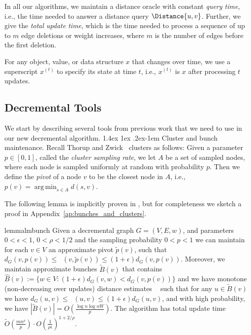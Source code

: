 \documentclass[11pt]{article}
\makeatletter
\theoremstyle{definition}
\theoremstyle{remark}
\DeclareMathOperator*{\argmin}{arg\,min}
\DeclareMathOperator{\dLNbunch}{\delta_{\tilde{B}}}
\renewcommand{\paragraph}{%
  \@startsection{paragraph}{4}%
  {\z@}{1.4ex \@plus 1ex \@minus .2ex}{-1em}%
  {\normalfont\normalsize\bfseries}%
}
\makeatother
\begin{document}
\begin{titlepage}
In all our algorithms, we maintain a distance oracle with constant \emph{query time}, i.e., the time needed to answer a distance query $\Distance{u,v}$.
Further, we give the \emph{total update time}, which is the time needed to process a sequence of up to $m$ edge deletions or weight increases, where $m$ is the number of edges before the first deletion. 

For any object, value, or data structure $x$ that changes over time, we use a superscript $x^{(t)}$ to specify its state at time $t$, i.e., $x^{(t)}$ is $x$ after processing $t$ updates. 



\subsection{Decremental Tools}\label{sc:decr_tools}
We start by describing several tools from previous work that we need to use in our new decremental algorithm.
\paragraph{Cluster and bunch maintenance.} 
Recall Thorup and Zwick~\cite{TZ2005} clusters as follows: Given a parameter $p\in [0,1]$, called the \emph{cluster sampling rate}, we let $A$ be a set of sampled nodes, where each node is sampled uniformly at random with probability $p$. Then we define the \emph{pivot} of a node $v$ to be the closest node in $A$, i.e., $p(v)=\argmin_{s\in A} d(s,v)$. 

The following lemma is implicitly proven in \cite{LN2020}, but for completeness we sketch a proof in Appendix~\ref{ap:bunches_and_clusters}.

\begin{restatable}{lemma}{lmbunch} \label{lm:approx_bunches_on_G}
Given a decremental graph $G=(V,E,w)$, and parameters $0< \epsilon <1$, $0<\rho<1/2$ and the sampling probability $0< p <1$ we can maintain for each $v\in V$ an approximate pivot $\tilde p(v)$, such that $d_G(v,p(v)) \leq \dLNbunch(v,\tilde{p}(v)) \leq (1+\epsilon) d_G(v,p(v))$.
Moreover, we maintain approximate bunches $\tilde{B}(v)$ that contains
$\hat{B}(v):= \{ w \in V : (1+\epsilon)d_G(v,w) < d_G(v, p(v)) \}$ and we have monotone (non-decreasing over updates) distance estimates $\dLNbunch$ such that for any $u \in \tilde{B}(v)$ we have $d_G(u,v) \leq \dLNbunch(u,v) \leq (1+\epsilon) d_G(u,v)$, and with high probability, we have $|\tilde{B}(v)| = O(\frac{\log n\log nW}{p})$. The algorithm has total update time $\tilde O(\tfrac{mn^\rho}{p}) \cdot O(\frac{1}{\rho \epsilon})^{1+2/\rho}$.
\end{restatable}


\end{titlepage}
\end{document}
